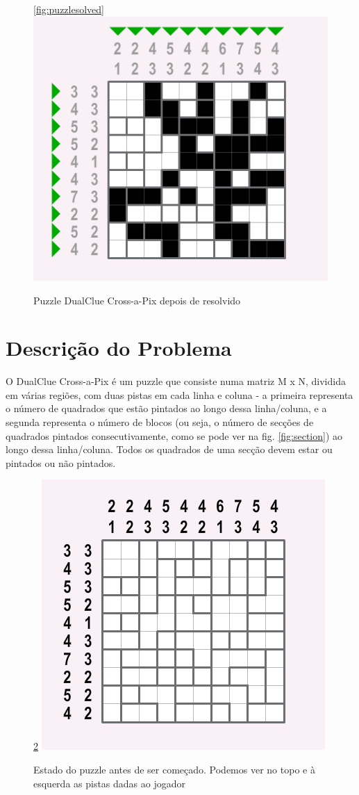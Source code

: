 \documentclass[runningheads,a4paper]{llncs}
\begin{document}
\begin{figure}[h]
\ref{fig:puzzlesolved}
\centering
\includegraphics[scale=0.5]{res/puzzlesolved.png}
\caption{Puzzle DualClue Cross-a-Pix depois de resolvido}
\label{fig:emptypuzzle}
\end{figure}

\section{Descrição do Problema}

O DualClue Cross-a-Pix é um puzzle que consiste numa matriz M x N, dividida em várias regiões, com duas pistas em cada linha e coluna - a primeira representa o número de quadrados que estão pintados ao longo dessa linha/coluna, e a segunda representa o número de blocos (ou seja, o número de secções de quadrados pintados consecutivamente, como se pode ver na fig. \ref{fig:section}) ao longo dessa linha/coluna. Todos os quadrados de uma secção devem estar ou pintados ou não pintados.

\begin{figure}[h]
\ref{fig:emptypuzzle}
\centering
\includegraphics[scale=0.5]{res/emptypuzzle.png}
\caption{Estado do puzzle antes de ser começado. Podemos ver no topo e à esquerda as pistas dadas ao jogador}
\label{fig:emptypuzzle}
\end{figure}
\end{document}
